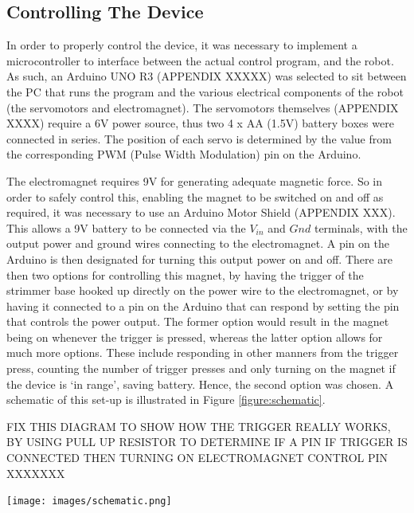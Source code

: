 \documentclass[11pt]{article}
\begin{document}
\pagebreak
\subsection{Controlling The Device}

In order to properly control the device, it was necessary to implement a microcontroller to interface between the actual control program, and the robot. As such, an Arduino UNO R3 (APPENDIX XXXXX) was selected to sit between the PC that runs the program and the various electrical components of the robot (the servomotors and electromagnet). The servomotors themselves (APPENDIX XXXX) require a 6V power source, thus two 4 x AA (1.5V) battery boxes were connected in series. The position of each servo is determined by the value from the corresponding PWM (Pulse Width Modulation) pin on the Arduino. 

The electromagnet requires 9V for generating adequate magnetic force. So in order to safely control this, enabling the magnet to be switched on and off as required, it was necessary to use an Arduino Motor Shield (APPENDIX XXX). This allows a 9V battery to be connected via the $V_{in}$ and $Gnd$ terminals, with the output power and ground wires connecting to the electromagnet. A pin on the Arduino is then designated for turning this output power on and off. There are then two options for controlling this magnet, by having the trigger of the strimmer base hooked up directly on the power wire to the electromagnet, or by having it connected to a pin on the Arduino that can respond by setting the pin that controls the power output. The former option would result in the magnet being on whenever the trigger is pressed, whereas the latter option allows for much more options. These include responding in other manners from the trigger press, counting the number of trigger presses and only turning on the magnet if the device is `in range', saving battery. Hence, the second option was chosen. A schematic of this set-up is illustrated in Figure \ref{figure:schematic}.


FIX THIS DIAGRAM TO SHOW HOW THE TRIGGER REALLY WORKS, BY USING PULL UP RESISTOR TO DETERMINE IF A PIN IF TRIGGER IS CONNECTED THEN TURNING ON ELECTROMAGNET CONTROL PIN XXXXXXX

\begin{center}
\texttt{[image: images/schematic.png]}
\label{figure:schematic}
\end{center}
\end{document}
